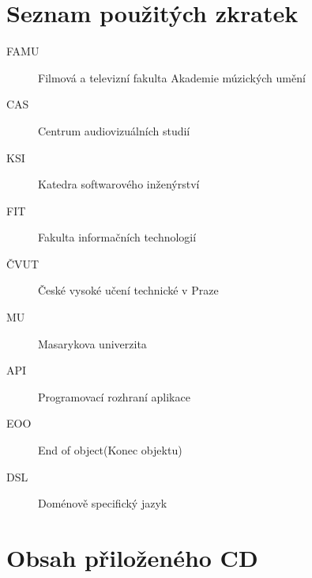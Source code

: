 \documentclass[thesis=B,czech]{FITthesis}[2012/06/26]
\begin{document}



\appendix

\chapter{Seznam použitých zkratek}
\begin{description}
	\item[FAMU] Filmová a televizní fakulta Akademie múzických umění
	\item[CAS] Centrum audiovizuálních studií
	\item[KSI] Katedra softwarového inženýrství
	\item[FIT] Fakulta informačních technologií
	\item[ČVUT] České vysoké učení technické v Praze
	\item[MU] Masarykova univerzita
	\item[API] Programovací rozhraní aplikace
	\item[EOO] End of object(Konec objektu)
	\item[DSL] Doménově specifický jazyk
\end{description}


\chapter{Obsah přiloženého CD}

\begin{figure}
\end{figure}
\end{document}

